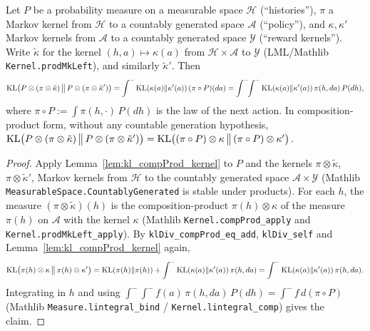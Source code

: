 \begin{lemma}\label{lem:pi_kl_step}
\leanok
{}
Let $P$ be a probability measure on a measurable space $\mathcal{H}$ (``histories''), $\pi$ a
Markov kernel from $\mathcal{H}$ to a countably generated space $\mathcal{A}$ (``policy''),
and $\kappa,\kappa'$ Markov kernels from $\mathcal{A}$ to a countably generated space
$\mathcal{Y}$ (``reward kernels'').
Write $\tilde\kappa$ for the kernel $(h,a)\mapsto\kappa(a)$ from $\mathcal{H}\times\mathcal{A}$
to $\mathcal{Y}$ (LML/Mathlib \texttt{Kernel.prodMkLeft}), and similarly $\tilde\kappa'$. Then
\[
  \mathrm{KL}\big(P\otimes(\pi\otimes\tilde\kappa)\,\big\|\,P\otimes(\pi\otimes\tilde\kappa')\big)
  = \int^- \mathrm{KL}(\kappa(a)\|\kappa'(a))\,(\pi\circ P)(da)
  = \int^-\!\!\int^- \mathrm{KL}(\kappa(a)\|\kappa'(a))\,\pi(h,da)\,P(dh),
\]
where $\pi\circ P := \int \pi(h,\cdot)\,P(dh)$ is the law of the next action. In
composition-product form, without any countable generation hypothesis,
$\mathrm{KL}\big(P\otimes(\pi\otimes\tilde\kappa)\,\big\|\,P\otimes(\pi\otimes\tilde\kappa')\big)
  = \mathrm{KL}\big((\pi\circ P)\otimes\kappa\,\big\|\,(\pi\circ P)\otimes\kappa'\big)$.
\end{lemma}

\begin{proof}
\leanok
{}
Apply Lemma~\ref{lem:kl_compProd_kernel} to $P$ and the kernels $\pi\otimes\tilde\kappa$,
$\pi\otimes\tilde\kappa'$, Markov kernels from $\mathcal{H}$ to the countably generated space
$\mathcal{A}\times\mathcal{Y}$ (Mathlib \texttt{MeasurableSpace.CountablyGenerated} is stable
under products). For each $h$, the measure
$(\pi\otimes\tilde\kappa)(h)$ is the composition-product $\pi(h)\otimes\kappa$ of the measure
$\pi(h)$ on $\mathcal{A}$ with the kernel $\kappa$ (Mathlib
\texttt{Kernel.compProd\_apply} and \texttt{Kernel.prodMkLeft\_apply}). By
\texttt{klDiv\_compProd\_eq\_add}, \texttt{klDiv\_self} and Lemma~\ref{lem:kl_compProd_kernel}
again,
\[
  \mathrm{KL}\big(\pi(h)\otimes\kappa\,\big\|\,\pi(h)\otimes\kappa'\big)
  = \mathrm{KL}(\pi(h)\|\pi(h)) + \int^-\mathrm{KL}(\kappa(a)\|\kappa'(a))\,\pi(h,da)
  = \int^-\mathrm{KL}(\kappa(a)\|\kappa'(a))\,\pi(h,da).
\]
Integrating in $h$ and using $\int^-\!\int^- f(a)\,\pi(h,da)\,P(dh) = \int^- f\,d(\pi\circ P)$
(Mathlib \texttt{Measure.lintegral\_bind} / \texttt{Kernel.lintegral\_comp}) gives the claim.
\end{proof}

